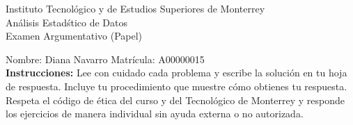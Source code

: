 \documentclass[10pt]{report}
\begin{document}
\newpage



\begin{center}
{\large Instituto Tecnol\'{o}gico y de Estudios Superiores de Monterrey \\
An\'alisis Estad\'stico de Datos } \\
Examen Argumentativo (Papel)
\end{center}

Nombre: \underline{\hspace*{.2in}}
Diana Navarro
\underline{\hspace*{.2in}} \quad Matr\'icula:\underline{\hspace*{.2in}}
A00000015
\underline{\hspace*{.2in}} \\

{\bf Instrucciones:} Lee con cuidado cada problema y escribe la soluci\'on
en tu hoja de respuesta. Incluye tu procedimiento que muestre c\'omo obtienes tu respuesta.  Respeta el c\'odigo de \'etica del curso y del Tecnol\'ogico de Monterrey y responde los ejercicios de manera individual sin ayuda externa o no autorizada.
\end{document}
